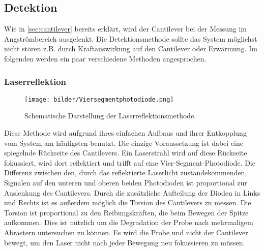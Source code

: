 \subsection{Detektion}
\label{sec:detektion}
    Wie in \autoref{sec:cantilever} bereits erklärt, wird der Cantilever bei der Messung im Angströmbereich ausgelenkt.
    Die Detektionsmethode sollte das System möglichst nicht stören z.B. durch Kraftauswirkung auf den Cantilever oder Erwärmung.
    Im folgenden werden ein paar verschiedene Methoden angesprochen.

    \newpage
    \subsubsection*{Laserreflektion}
        \begin{wrapfigure}{r}{0.4\textwidth}
            \centering{}
            \texttt{[image: bilder/Viersegmentphotodiode.png]}
            \caption{Schematische Darstellung der Laserreflektionsmethode. \cite{voigtlaender}} \vspace*{-0.3cm}
            \label{fig:Viersegmentphotodiode}
        \end{wrapfigure}
        \FloatBarrier
        Diese Methode wird aufgrund ihres einfachen Aufbaus und ihrer Entkopplung vom System am häufigsten benutzt.
        Die einzige Voraussetzung ist dabei eine spiegelnde Rückseite des Cantilevers.
        Ein Laserstrahl wird auf diese Rückseite fokussiert, wird dort reflektiert und trifft auf eine Vier-Segment-Photodiode.
        Die Differenz zwischen den, durch das reflektierte Laserlicht zustandekommenden, Signalen auf den unteren und oberen beiden Photodioden ist proportional zur Auslenkung des Cantilevers.
        Durch die zusätzliche Aufteilung der Dioden in Links und Rechts ist es außerdem möglich die Torsion des Cantilevers zu messen.
        Die Torsion ist proportional zu den Reibungskräften, die beim Bewegen der Spitze aufkommen.
        Dies ist nützlich um die Degradation der Probe nach mehrmaligem Abrastern untersuchen zu können.
        Es wird die Probe und nicht der Cantilever bewegt, um den Laser nicht nach jeder Bewegung neu fokussieren zu müssen.


